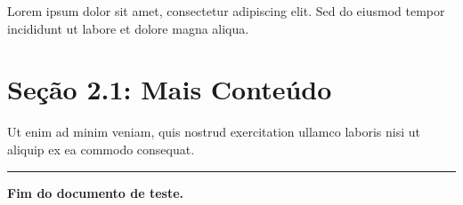 \documentclass[
]{book}
\begin{document}
Lorem ipsum dolor sit amet, consectetur adipiscing elit. Sed do eiusmod
tempor incididunt ut labore et dolore magna aliqua.

\hypertarget{seuxe7uxe3o-2.1-mais-conteuxfado}{%
\section{Seção 2.1: Mais
Conteúdo}\label{seuxe7uxe3o-2.1-mais-conteuxfado}}

Ut enim ad minim veniam, quis nostrud exercitation ullamco laboris nisi
ut aliquip ex ea commodo consequat.

\begin{center}\rule{0.5\linewidth}{0.5pt}\end{center}

\textbf{Fim do documento de teste.}

\backmatter
\end{document}
